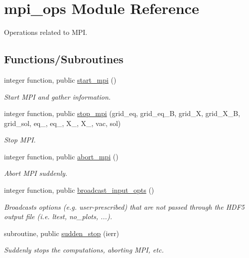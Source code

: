 \hypertarget{namespacempi__ops}{}\section{mpi\+\_\+ops Module Reference}
\label{namespacempi__ops}


Operations related to M\+PI.  


\subsection*{Functions/\+Subroutines}
\begin{DoxyCompactItemize}
\item 
integer function, public \hyperlink{namespacempi__ops_a804ec65ff711509de1f8873f97bdf967}{start\+\_\+mpi} ()
\begin{DoxyCompactList}\small\item\em Start M\+PI and gather information. \end{DoxyCompactList}\item 
integer function, public \hyperlink{namespacempi__ops_a9dcb5624e665c9e15a4203edb5f44b0f}{stop\+\_\+mpi} (grid\+\_\+eq, grid\+\_\+eq\+\_\+B, grid\+\_\+X, grid\+\_\+\+X\+\_\+B, grid\+\_\+sol, eq\+\_, eq\+\_, X\+\_, X\+\_, vac, sol)
\begin{DoxyCompactList}\small\item\em Stop M\+PI. \end{DoxyCompactList}\item 
integer function, public \hyperlink{namespacempi__ops_a54d9258ef985728345579e8e57dc8dfe}{abort\+\_\+mpi} ()
\begin{DoxyCompactList}\small\item\em Abort M\+PI suddenly. \end{DoxyCompactList}\item 
integer function, public \hyperlink{namespacempi__ops_a932eba1c998dd7a0f1191b55cd754be3}{broadcast\+\_\+input\+\_\+opts} ()
\begin{DoxyCompactList}\small\item\em Broadcasts options (e.\+g. user-\/prescribed) that are not passed through the H\+D\+F5 output file (i.\+e. {\ttfamily ltest}, {\ttfamily no\+\_\+plots}, ...). \end{DoxyCompactList}\item 
subroutine, public \hyperlink{namespacempi__ops_a40e8610357a9a5b075fef9dab1c3f24f}{sudden\+\_\+stop} (ierr)
\begin{DoxyCompactList}\small\item\em Suddenly stops the computations, aborting M\+PI, etc. \end{DoxyCompactList}\end{DoxyCompactItemize}


